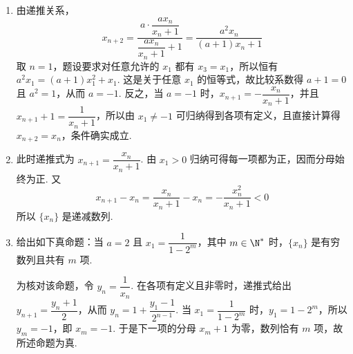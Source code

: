 \begin{solution}
\begin{enumerate}
\item 由递推关系，
\[
x_{n+2}=\frac{a\cdot\dfrac{ax_n}{x_n+1}}{\dfrac{ax_n}{x_n+1}+1}=\frac{a^2x_n}{(a+1)x_n+1}
\]
取 \(n=1\)，题设要求对任意允许的 \(x_1\) 都有 \(x_3=x_1\)，所以恒有 \(a^2x_1=(a+1)x_1^2+x_1\). 这是关于任意 \(x_1\) 的恒等式，故比较系数得 \(a+1=0\) 且 \(a^2=1\)，从而 \(a=-1\). 反之，当 \(a=-1\) 时，\(x_{n+1}=-\dfrac{x_n}{x_n+1}\)，并且 \(x_{n+1}+1=\dfrac{1}{x_n+1}\)，所以由 \(x_1\ne-1\) 可归纳得到各项有定义，且直接计算得 \(x_{n+2}=x_n\)，条件确实成立.

\item 此时递推式为 \(x_{n+1}=\dfrac{x_n}{x_n+1}\). 由 \(x_1>0\) 归纳可得每一项都为正，因而分母始终为正. 又
\[
x_{n+1}-x_n=\frac{x_n}{x_n+1}-x_n=-\frac{x_n^2}{x_n+1}<0
\]
所以 \(\{x_n\}\) 是递减数列.

\item 给出如下真命题：当 \(a=2\) 且 \(x_1=\dfrac{1}{1-2^m}\)，其中 \(m\in\N^*\) 时，\(\{x_n\}\) 是有穷数列且共有 \(m\) 项.

为核对该命题，令 \(y_n=\dfrac{1}{x_n}\). 在各项有定义且非零时，递推式给出 \(y_{n+1}=\dfrac{y_n+1}{2}\)，从而 \(y_n=1+\dfrac{y_1-1}{2^{n-1}}\). 当 \(x_1=\dfrac{1}{1-2^m}\) 时，\(y_1=1-2^m\)，所以 \(y_m=-1\)，即 \(x_m=-1\). 于是下一项的分母 \(x_m+1\) 为零，数列恰有 \(m\) 项，故所述命题为真.
\end{enumerate}
\end{solution}
